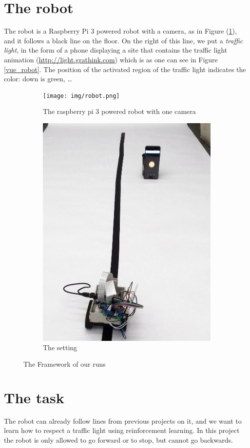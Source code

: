 \documentclass[14pt,a4paper]{article}
\theoremstyle{definition}
\begin{document}
\section{The robot}
The robot is a Raspberry Pi 3 powered robot with a camera, as in Figure (\ref{fig:sub1}), and it follows a black line on the floor. On the right of this line, we put a \emph{traffic light}, in the form of a phone displaying a site that contains the traffic light animation (\url{http://light.grathink.com})  which is as one can see in Figure \ref{vue_robot}. The position of the activated region of the traffic light indicates the color: down is green, \ldots

\begin{figure}[H]
\centering
\begin{subfigure}{.5\textwidth}
  \centering
  \texttt{[image: img/robot.png]}
  \caption{The raspberry pi 3 powered robot with one camera}
  \label{fig:sub1}
\end{subfigure}%
\begin{subfigure}{.5\textwidth}
  \centering
  \includegraphics[width=.5\linewidth]{img/setting1_mod1.png}
  \caption{The setting}
  \label{fig:sub2}
\end{subfigure}
\caption{The Framework of our runs}
\label{fig:test}
\end{figure}



\section{The task}
The robot can already follow lines from previous projects on it, and we want to learn how to respect a traffic light using reinforcement learning. In this project the robot is only allowed to go forward or to stop, but cannot go backwards.
\end{document}
